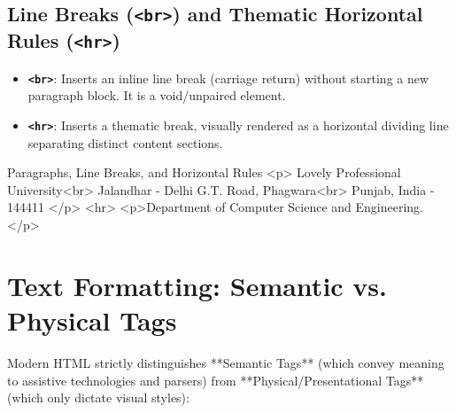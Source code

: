 \subsection{Line Breaks (\texttt{<br>}) and Thematic Horizontal Rules (\texttt{<hr>})}
\begin{itemize}[leftmargin=1.5em]
    \item \textbf{\texttt{<br>}}: Inserts an inline line break (carriage return) without starting a new paragraph block. It is a void/unpaired element.
    \item \textbf{\texttt{<hr>}}: Inserts a thematic break, visually rendered as a horizontal dividing line separating distinct content sections.
\end{itemize}

\begin{htmlcode}{Paragraphs, Line Breaks, and Horizontal Rules}
<p>
    Lovely Professional University<br>
    Jalandhar - Delhi G.T. Road, Phagwara<br>
    Punjab, India - 144411
</p>
<hr>
<p>Department of Computer Science and Engineering.</p>
\end{htmlcode}

\section{Text Formatting: Semantic vs. Physical Tags}

Modern HTML strictly distinguishes **Semantic Tags** (which convey meaning to assistive technologies and parsers) from **Physical/Presentational Tags** (which only dictate visual styles):

